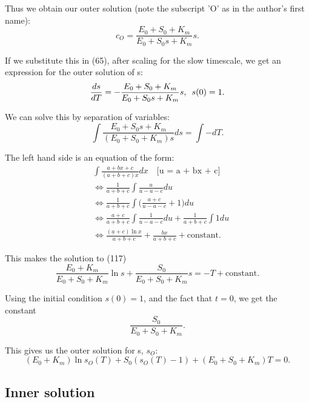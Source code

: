 \documentclass[12pt]{article}
\begin{document}
Thus we obtain our outer solution (note the subscript 'O' as in the
author's first name):
\begin{equation}
  c_O = \frac{E_0 + S_0 + K_m}{E_0+S_0 s+K_m} s.
\end{equation}

If we substitute this in (65), after scaling for the slow timescale,
we get an expression for the outer solution of s:
\begin{equation}
\frac{ds}{dT} = - \frac{E_0 + S_0 + K_m}{E_0 + S_0s + K_m}s, \enskip s(0) = 1.
\end{equation}

We can solve this by separation of variables:
\begin{equation}
\int \frac{E_0 + S_0 s + K_m}{(E_0 + S_0 + K_m) s} ds = \int - dT.
\end{equation}

The left hand side is an equation of the form:
\begin{align}
&\int \frac{a + b x + c}{(a + b + c) x} dx
        \quad \text{[u = a + bx + c]} \\
&\iff \frac{1}{a+b+c} \int \frac{u}{u - a -c} du \\
&\iff \frac{1}{a+b+c} \int \Big(\frac{a+c}{u - a -c} + 1\Big)
                          du \\
&\iff \frac{a+c}{a+b+c} \int \frac{1}{u - a - c} du
                    + \frac{1}{a+b+c} \int 1 du \\
&\iff \frac{(a+c) \ln{x}}{a+b+c} + \frac{bx}{a+b+c} + \text{constant}.
\end{align}

This makes the solution to (117)
\begin{equation}
\frac{E_0+K_m}{E_0 + S_0 + K_m} \ln{s} + \frac{S_0}{E_0 + S_0 + K_m} s = - T + \text{constant}.
\end{equation}

Using the initial condition $s(0)=1$, and the fact that $t=0$, we get
the constant
\begin{equation}
  \frac{S_0}{E_0 + S_0 + K_m}.
\end{equation}

This gives us the outer solution for s, $s_O$:
\begin{equation}
  (E_0+K_m) \ln{s_O(T)} + S_0 (s_O(T) - 1) + (E_0 + S_0 + K_m) T = 0.
\end{equation}

\subsection{Inner solution}
\end{document}
